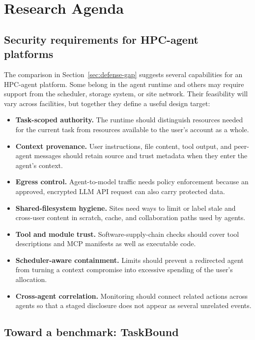 \section{Research Agenda}
\label{sec:research-agenda}

\subsection{Security requirements for HPC-agent platforms}
\label{sec:requirements}

The comparison in Section~\ref{sec:defense-gap} suggests several capabilities for an HPC-agent platform. Some belong in the agent runtime and others may require support from the scheduler, storage system, or site network. Their feasibility will vary across facilities, but together they define a useful design target:

\begin{itemize}[leftmargin=*]
  \item \textbf{Task-scoped authority.} The runtime should distinguish resources needed for the current task from resources available to the user's account as a whole.
  \item \textbf{Context provenance.} User instructions, file content, tool output, and peer-agent messages should retain source and trust metadata when they enter the agent's context.
  \item \textbf{Egress control.} Agent-to-model traffic needs policy enforcement because an approved, encrypted LLM API request can also carry protected data.
  \item \textbf{Shared-filesystem hygiene.} Sites need ways to limit or label stale and cross-user content in scratch, cache, and collaboration paths used by agents.
  \item \textbf{Tool and module trust.} Software-supply-chain checks should cover tool descriptions and MCP manifests as well as executable code.
  \item \textbf{Scheduler-aware containment.} Limits should prevent a redirected agent from turning a context compromise into excessive spending of the user's allocation.
  \item \textbf{Cross-agent correlation.} Monitoring should connect related actions across agents so that a staged disclosure does not appear as several unrelated events.
\end{itemize}

\subsection{Toward a benchmark: TaskBound}
\label{sec:benchmark}

